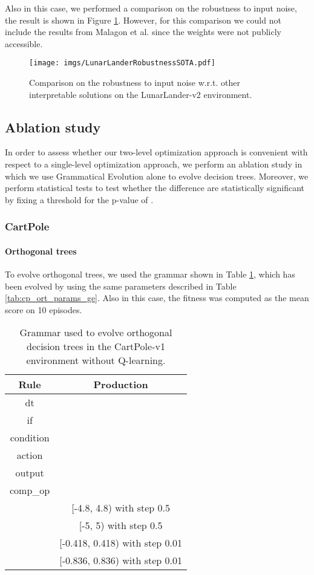 \documentclass[review,english]{elsarticle}
\begin{document}
Also in this case, we performed a comparison on the robustness to input noise, the result is shown in Figure \ref{fig:ll_noise_sota_comparison}.
However, for this comparison we could not include the results from Malagon et al. since the weights were not publicly accessible.

\begin{figure}[!ht]
    \centering
    \texttt{[image: imgs/LunarLanderRobustnessSOTA.pdf]}
    \caption{Comparison on the robustness to input noise w.r.t. other interpretable solutions on the LunarLander-v2 environment.}
    \label{fig:ll_noise_sota_comparison}
\end{figure}

\subsection{Ablation study}
In order to assess whether our two-level optimization approach is convenient with respect to a single-level optimization approach, we perform an ablation study in which we use Grammatical Evolution alone to evolve decision trees.
Moreover, we perform statistical tests to test whether the difference are statistically significant by fixing a threshold for the p-value of .

\subsubsection{CartPole}
\paragraph{Orthogonal trees}
To evolve orthogonal trees, we used the grammar shown in Table \ref{tab:cp_abl_ort_grammar}, which has been evolved by using the same parameters described in Table \ref{tab:cp_ort_params_ge}.
Also in this case, the fitness was computed as the mean score on 10 episodes.

\begin{table}
    \centering
    \begin{tabular}{|c|c|} \hline
        \textbf{Rule} & \textbf{Production} \\ \hline
        dt &  \\ if &  \\ condition &  \\ action &  \\ output &  \\ comp\_op &  \\  & [-4.8, 4.8) with step 0.5 \\  & [-5, 5) with step 0.5 \\  & [-0.418, 0.418) with step 0.01 \\  & [-0.836, 0.836) with step 0.01 \\ \hline
    \end{tabular}
    \caption{Grammar used to evolve orthogonal decision trees in the CartPole-v1 environment without Q-learning.}
    \label{tab:cp_abl_ort_grammar}
\end{table}
\end{document}
